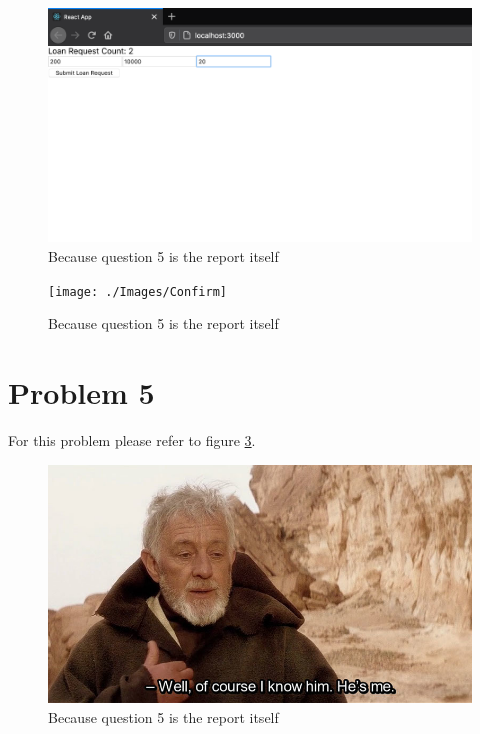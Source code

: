 \documentclass[a4paper, 12pt]{article}
\begin{document}
\begin{figure}[h!]
	\centering
	\includegraphics[width=\textwidth]{./Images/webSubmit}
	\caption{Because question 5 is the report itself}
	\label{fig:webSubmit}
\end{figure}

\begin{figure}[h!]
	\centering
	\texttt{[image: ./Images/Confirm]}
	\caption{Because question 5 is the report itself}
	\label{fig:webConfirm}
\end{figure}

\section{Problem 5}
For this problem please refer to figure \ref{fig:obi}.

\begin{figure}[h!]
	\centering
	\includegraphics[width=\textwidth]{./Images/obi}
	\caption{Because question 5 is the report itself}
	\label{fig:obi}
\end{figure}

%
\end{document}
